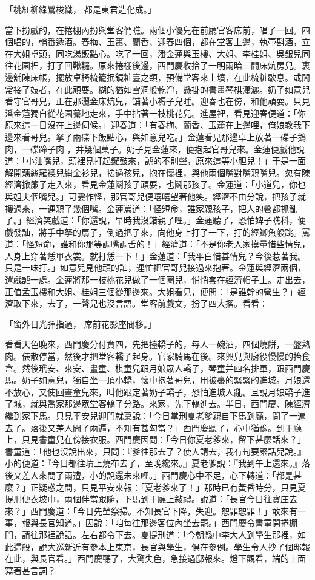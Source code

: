 \begin{showcontents}{}
「桃紅柳綠鶯梭織，  都是東君造化成。」

當下扮戲的，在捲棚內扮與堂客們瞧。兩個小優兒在前廳官客席前，唱了一回。四個唱的，輪番遞酒。春梅、玉簫、蘭香、迎春四個，都在堂客上邊，執壺斟酒，立在大姐卓頭，同吃湯飯點心。吃了一回，潘金蓮與玉樓、大姐、李桂姐、吳銀兒同往花園裡，打了回鞦韆。原來捲棚後邊，西門慶收拾了一明兩暗三間床炕房兒。裏邊舖陳床帳，擺放卓椅梳籠抿鏡粧臺之類，預備堂客來上墳，在此梳粧歇息。或閒常接了妓者，在此頑耍。糊的猶如雪洞般乾淨，懸掛的書畫琴棋瀟灑。奶子如意兒看守官哥兒，正在那灑金床炕兒，舖著小褥子兒睡。迎春也在傍，和他頑耍。只見潘金蓮獨自從花園驀地走來，手中拈著一枝桃花兒。進屋裡，看見迎春便道：「你原來這一日沒在上邊伺候。」迎春道：「有春梅、蘭香、玉蕭在上邊哩，俺娘教我下邊來看哥兒。拏了兩碟下飯點心，與如意兒吃。」金蓮看見那邊卓上放著一碟子鵝肉，一碟蹄子肉 ，并幾個菓子。奶子見金蓮來，便抱起官哥兒來。金蓮便戲他說道：「小油嘴兒，頭裡見打起鑼鼓來，諕的不則聲，原來這等小胆兒！」于是一面解開藕絲羅襖兒綃金衫兒，接過孩兒，抱在懷裡，與他兩個嘴對嘴親嘴兒。忽有陳經濟掀簾子走入來，看見金蓮鬬孩子頑耍，也鬬那孩子。金蓮道：「小道兒，你也與姐夫個嘴兒。」可霎作怪，那官哥兒便嘻嘻望著他笑。經濟不由分說，把孩子就摟過來，一連親了幾個嘴。金蓮罵道：「怪短命，誰家親孩子，把人的鬢都抓亂了。」經濟笑戲道：「你還說，早時我沒錯親了哩。」金蓮聽了，恐怕婢子瞧科，便戲發訕，將手中拏的扇子，倒過把子來，向他身上打了一下，打的經鯽魚般跳。罵道：「怪短命，誰和你那等調嘴調舌的！」經濟道：「不是你老人家摸量惜些情兒，人身上穿著恁單衣裳。就打恁一下！」金蓮道：「我平白惜甚情兒？今後惹著我。只是一味打。」如意兒見他頑的訕，連忙把官哥兒接過來抱著。金蓮與經濟兩個，還戲謔一處。金蓮將那一枝桃花兒做了一個圈兒，悄悄套在經濟帽子上。走出去，正值孟玉樓和大姐、桂姐三個從那邊來。大姐看見，便問：「是誰幹的營生？」經濟取下來，去了，一聲兒也沒言語。堂客前戲文，扮了四大摺。看看：

「窗外日光彈指過，  席前花影座間移。」

看看天色晚來，西門慶分付賁四，先把擡轎子的，每人一碗酒，四個燒餅，一盤熟肉。俵散停當，然後才把堂客轎子起身。官家騎馬在後。來興兒與廚役慢慢的抬食盒。然後玳安、來安、畫童、棋童兒跟月娘眾人轎子，琴童并四名排軍，跟西門慶馬。奶子如意兒，獨自坐一頂小轎，懷中抱著哥兒，用被裹的緊緊的進城。月娘還不放心，又使回畫童兒來，叫他跟定著奶子轎子，恐怕進城人亂。且說月娘轎子進了城，就與喬家那邊眾堂客轎子分路。來家，先下轎進去。半日，西門慶、陳經濟纔到家下馬。只見平安兒迎門就稟說：「今日掌刑夏老爹親自下馬到廳，問了一遍去了。落後又差人問了兩遍，不知有甚勾當？」西門慶聽了，心中猶豫。到于廳上，只見書童兒在傍接衣服。西門慶因問：「今日你夏老爹來，留下甚麼話來？」書童道：「他也沒說出來，只問：『爹往那去了？使人請去，我有句要緊話兒說。』小的便道：『今日都往墳上燒布去了，至晚纔來。』夏老爹說：『我到午上還來。』落後又差人來問了兩遭，小的說還未來哩。」西門慶心中不足，心下轉道：「都是甚麼？」正疑惑之間，只見平安來報：「夏老爹來了！」那時已有黃昏時分，只見夏提刑便衣坡巾，兩個伴當跟隨，下馬到于廳上敍禮。說道：「長官今日往寶庄去來？」西門慶道：「今日先塋祭掃。不知長官下降，失迎。恕罪恕罪！」敢來有一事，報與長官知道。」因說：「咱每往那邊客位內坐去罷。」西門慶令書童開捲棚門，請往那裡說話。左右都令下去。夏提刑道：「今朝縣中李大人到學生那裡，如此這般，說大巡新近有參本上東京，長官與學生，俱在參例。學生令人抄了個邸報在此，與長官看。」西門慶聽了，大驚失色，急接過邸報來。燈下觀看，端的上面寫著甚言詞？


\end{showcontents}
